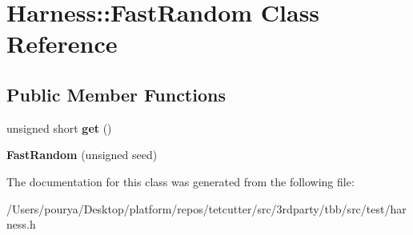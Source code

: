 \hypertarget{classHarness_1_1FastRandom}{}\section{Harness\+:\+:Fast\+Random Class Reference}
\label{classHarness_1_1FastRandom}
\subsection*{Public Member Functions}
\begin{DoxyCompactItemize}
\item 
\hypertarget{classHarness_1_1FastRandom_a23ef27808783a96f286caf2f1af4d3dc}{}unsigned short {\bfseries get} ()\label{classHarness_1_1FastRandom_a23ef27808783a96f286caf2f1af4d3dc}

\item 
\hypertarget{classHarness_1_1FastRandom_a6656c1020c77c55a6aac6f42b5f0dc95}{}{\bfseries Fast\+Random} (unsigned seed)\label{classHarness_1_1FastRandom_a6656c1020c77c55a6aac6f42b5f0dc95}

\end{DoxyCompactItemize}


The documentation for this class was generated from the following file\+:\begin{DoxyCompactItemize}
\item 
/\+Users/pourya/\+Desktop/platform/repos/tetcutter/src/3rdparty/tbb/src/test/harness.\+h\end{DoxyCompactItemize}
